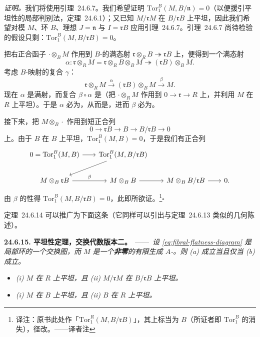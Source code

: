 \emph{证明。}\quad 我们将使用\mbox{引理~24.6.7}。我们希望证明 $\mathrm{Tor}^B_1(M,B/\mathfrak{n})=0$（以便援引平坦性的局部判别法，\mbox{定理~24.6.1}）；又已知 $M/\mathfrak{r}M$ 在 $B/\mathfrak{r}B$ 上平坦，因此我们希望对模 $M$、环 $B$、理想 $J=\mathfrak{n}$ 与 $I=\mathfrak{r}B$ 应用\mbox{引理~24.6.7}。\mbox{引理~24.6.7} 尚待检验的假设只剩：$\mathrm{Tor}^B_1(M,B/\mathfrak{r}B)=0$。

把右正合函子 $\cdot\otimes_B M$ 作用到 $B$-\trModule{}的满态射 $\mathfrak{r}\otimes_R B\twoheadrightarrow\mathfrak{r}B$ 上，便得到一个满态射
\[
\alpha\colon \mathfrak{r}\otimes_R M=\mathfrak{r}\otimes_R B\otimes_B M \twoheadrightarrow (\mathfrak{r}B)\otimes_B M.
\]
考虑 $B$-\trModule{}映射的复合 $\gamma$：
\[
\mathfrak{r}\otimes_R M \xrightarrow{\ \alpha\ } (\mathfrak{r}B)\otimes_B M \xrightarrow{\ \beta\ } M.
\]
现在 $\alpha$ 是满射，而复合 $\beta\circ\alpha$ 是\trInjectiveMap（把 $\cdot\otimes_R M$ 作用到 $0\to\mathfrak{r}\to R$ 上，并利用 $M$ 在 $R$ 上平坦）。于是 $\alpha$ 必为\trInjectiveMap，从而是\trIsomorphism，进而 $\beta$ 必为\trInjectiveMap。

接下来，把 $M\otimes_B\cdot$ 作用到短正合列
\[
0 \longrightarrow \mathfrak{r}B \longrightarrow B \longrightarrow B/\mathfrak{r}B \longrightarrow 0
\]
上。由于 $B$ 在 $B$ 上平坦，$\mathrm{Tor}^B_1(M,B)=0$，于是我们有正合列
\[
\begin{tikzcd}[row sep=2em, column sep=1.9em]
0=\mathrm{Tor}^B_1(M,B) \ar[r] & \mathrm{Tor}^B_1(M,B/\mathfrak{r}B) \ar[dl] & \\
M\otimes_B\mathfrak{r}B \ar[r, "\beta"] & M\otimes_B B \ar[r] & M\otimes_B B/\mathfrak{r}B \ar[r] & 0.
\end{tikzcd}
\]
由 $\beta$ 的\trInjectiveMap{}性得 $\mathrm{Tor}^B_1(M,B/\mathfrak{r}B)=0$，此即所欲证。\footnote{译注：原书此处作「$\mathrm{Tor}^R_1(M,B/\mathfrak{r}B)$」，其上标当为 $B$（所证者即 $\mathrm{Tor}^B_1$ 的消失），径改。——译者注}\hfill$\square$

\mbox{定理~24.6.14} 可以推广为下面这条（它同样可以引出与\mbox{定理~24.6.13} 类似的几何陈述）。

\textbf{24.6.15. \trFiber{}平坦性定理，交换代数版本二。}\ ——\ \emph{设 \eqref{eq:fibral-flatness-diagram} 是\trNoether{}局部环的一个交换图，而 $M$ 是一个\textbf{非零}的有限生成 $A$-\trModule。则 (a) 成立当且仅当 (b) 成立。}
\begin{itemize}
\item[(a)]\emph{(i) $M$ 在 $R$ 上平坦，且 (ii) $M/\mathfrak{r}M$ 在 $B/\mathfrak{r}B$ 上平坦。}
\item[(b)]\emph{(i) $M$ 在 $B$ 上平坦，且 (ii) $B$ 在 $R$ 上平坦。}
\end{itemize}

